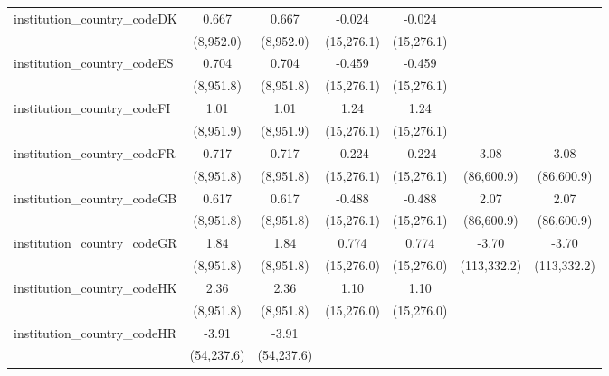\begin{tabular}{lcccccc}
   institution\_country\_codeDK          & 0.667         & 0.667         & -0.024        & -0.024        &              &   \\   
                                         & (8,952.0)     & (8,952.0)     & (15,276.1)    & (15,276.1)    &              &   \\   
   institution\_country\_codeES          & 0.704         & 0.704         & -0.459        & -0.459        &              &   \\   
                                         & (8,951.8)     & (8,951.8)     & (15,276.1)    & (15,276.1)    &              &   \\   
   institution\_country\_codeFI          & 1.01          & 1.01          & 1.24          & 1.24          &              &   \\   
                                         & (8,951.9)     & (8,951.9)     & (15,276.1)    & (15,276.1)    &              &   \\   
   institution\_country\_codeFR          & 0.717         & 0.717         & -0.224        & -0.224        & 3.08         & 3.08\\   
                                         & (8,951.8)     & (8,951.8)     & (15,276.1)    & (15,276.1)    & (86,600.9)   & (86,600.9)\\   
   institution\_country\_codeGB          & 0.617         & 0.617         & -0.488        & -0.488        & 2.07         & 2.07\\   
                                         & (8,951.8)     & (8,951.8)     & (15,276.1)    & (15,276.1)    & (86,600.9)   & (86,600.9)\\   
   institution\_country\_codeGR          & 1.84          & 1.84          & 0.774         & 0.774         & -3.70        & -3.70\\   
                                         & (8,951.8)     & (8,951.8)     & (15,276.0)    & (15,276.0)    & (113,332.2)  & (113,332.2)\\   
   institution\_country\_codeHK          & 2.36          & 2.36          & 1.10          & 1.10          &              &   \\   
                                         & (8,951.8)     & (8,951.8)     & (15,276.0)    & (15,276.0)    &              &   \\   
   institution\_country\_codeHR          & -3.91         & -3.91         &               &               &              &   \\   
                                         & (54,237.6)    & (54,237.6)    &               &               &              &   \\   

\end{tabular}
